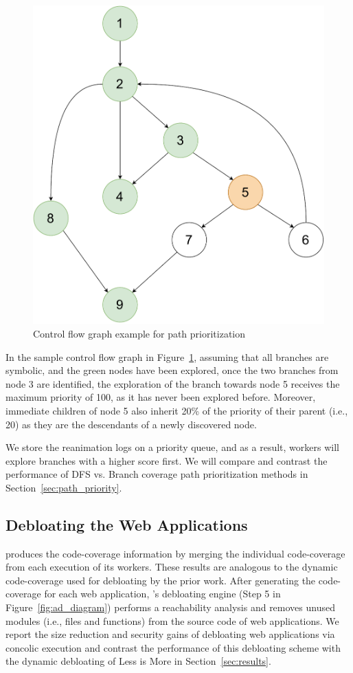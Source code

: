\begin{figure}[t]
    \centering
    \includegraphics[width=0.3\linewidth]{figures/ad/AD_Path_Prio_CFG.pdf}
    \caption{Control flow graph example for path prioritization}
    \label{fig:cfg_pathprioritization}
\end{figure}

In the sample control flow graph in Figure~\ref{fig:cfg_pathprioritization}, assuming that all branches are symbolic, and the green nodes have been explored, once the two branches from node 3 are identified, the exploration of the branch towards node 5 receives the maximum priority of 100, as it has never been explored before. 
Moreover, immediate children of node 5 also inherit 20\% of the priority of their parent (i.e., 20) as they are the descendants of a newly discovered node. 

We store the reanimation logs on a priority queue, and as a result, workers will explore branches with a higher score first. 
We will compare and contrast the performance of DFS vs. Branch coverage path prioritization methods in Section~\ref{sec:path_priority}. 

\subsection{Debloating the Web Applications}
\animatedead{} produces the code-coverage information by merging the individual code-coverage from each execution of its workers. 
These results are analogous to the dynamic code-coverage used for debloating by the prior work. 
After generating the code-coverage for each web application, \animatedead{}'s debloating engine (Step 5 in Figure~\ref{fig:ad_diagram}) performs a reachability analysis and removes unused modules (i.e., files and functions) from the source code of web applications. 
We report the size reduction and security gains of debloating web applications via concolic execution and contrast the performance of this debloating scheme with the dynamic debloating of Less is More in Section~\ref{sec:results}. 

